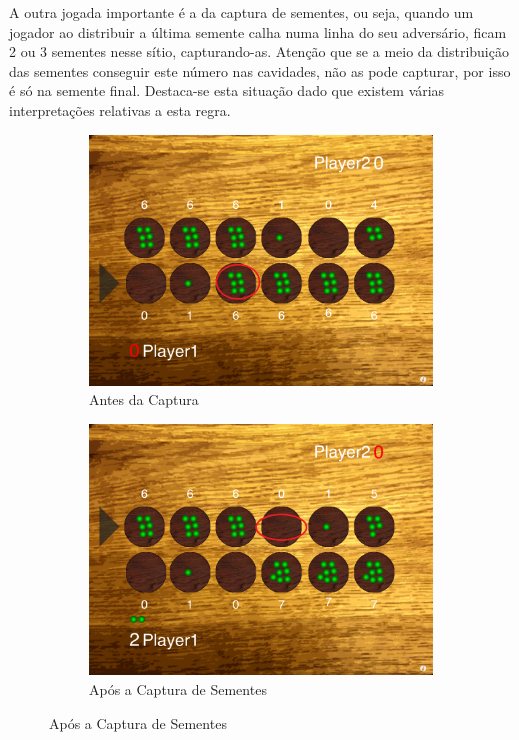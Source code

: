 \documentclass[15pt,a4paper]{article}
\begin{document}
A outra jogada importante é a da captura de sementes, ou seja, quando um jogador ao distribuir a última semente calha numa linha do seu adversário, ficam 2 ou 3 sementes nesse sítio, capturando-as. Atenção que se a meio da distribuição das sementes conseguir este número nas cavidades, não as pode capturar, por isso é só na semente final. Destaca-se esta situação dado que existem várias interpretações relativas a esta regra.

\begin{figure} [H]
        \centering
        \begin{subfigure}[f]{0.3\textwidth}
                \centering
                \includegraphics[scale=0.2]{antesCaptura.png}
				\caption{Antes da Captura}
                \label{fig:inicioJogo}
        \end{subfigure}%
        \quad  \quad
        \begin{subfigure}[f]{0.3\textwidth}
                \centering
                \includegraphics[scale=0.2]{captura.png}
				\caption{Após a Captura de Sementes}
				\label{fig:semCaptura}
        \end{subfigure}
\end{figure}
\end{document}
